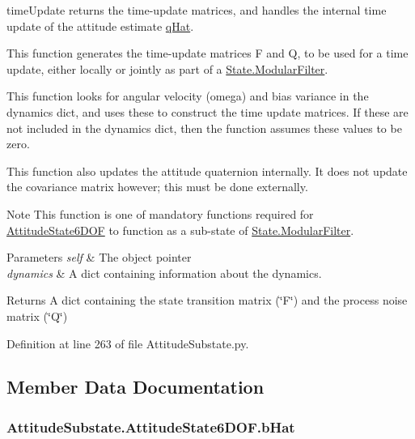 time\+Update returns the time-\/update matrices, and handles the internal time update of the attitude estimate \hyperlink{classAttitudeSubstate_1_1AttitudeState6DOF_a36a58a47280151dd544762d9a1d5c35d}{q\+Hat}. 

This function generates the time-\/update matrices F and Q, to be used for a time update, either locally or jointly as part of a \hyperlink{classState_1_1ModularFilter}{State.\+Modular\+Filter}.

This function looks for angular velocity (omega) and bias variance in the dynamics dict, and uses these to construct the time update matrices. If these are not included in the dynamics dict, then the function assumes these values to be zero.

This function also updates the attitude quaternion internally. It does not update the covariance matrix however; this must be done externally.

\begin{DoxyNote}{Note}
This function is one of mandatory functions required for \hyperlink{classAttitudeSubstate_1_1AttitudeState6DOF}{Attitude\+State6\+D\+OF} to function as a sub-\/state of \hyperlink{classState_1_1ModularFilter}{State.\+Modular\+Filter}.
\end{DoxyNote}

\begin{DoxyParams}{Parameters}
{\em self} & The object pointer \\
\hline
{\em dynamics} & A dict containing information about the dynamics.\\
\hline
\end{DoxyParams}
\begin{DoxyReturn}{Returns}
A dict containing the state transition matrix (\char`\"{}\+F\char`\"{}) and the process noise matrix (\char`\"{}\+Q\char`\"{}) 
\end{DoxyReturn}


Definition at line 263 of file Attitude\+Substate.\+py.



\subsection{Member Data Documentation}
\subsubsection[{\texorpdfstring{b\+Hat}{bHat}}]{\setlength{\rightskip}{0pt plus 5cm}Attitude\+Substate.\+Attitude\+State6\+D\+O\+F.\+b\+Hat}\hypertarget{classAttitudeSubstate_1_1AttitudeState6DOF_a1b8eff7c89a7a03875dc04263da7ec18}{}\label{classAttitudeSubstate_1_1AttitudeState6DOF_a1b8eff7c89a7a03875dc04263da7ec18}


